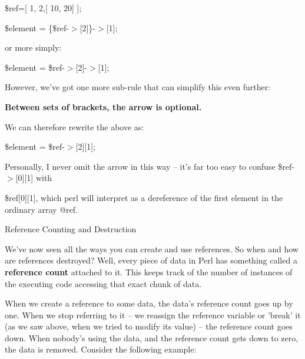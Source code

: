 \documentclass[a4paper,11pt]{book}
\begin{document}
\noindent 

\noindent 

\noindent \$ref=[ 1, 2,[ 10, 20] ];

\noindent \$element = \{\$ref-$>$[2]\}-$>$[1];

\noindent 

\noindent or more simply:

\noindent 

\noindent 

\noindent \$element = \$ref-$>$[2]-$>$[1];

\noindent 

\noindent However, we've got one more sub-rule that can simplify this even further:

\noindent 

\noindent 

\noindent \textbf{Between sets of brackets, the arrow is optional.}

\noindent 

\noindent 

\noindent We can therefore rewrite the above as:

\noindent 

\noindent \$element = \$ref-$>$[2][1];

\noindent 

\noindent 

\noindent Personally, I never omit the arrow in this way -- it's far too easy to confuse \$ref-$>$[0][1] with

\noindent \$ref[0][1], which perl will interpret as   a dereference of the first element in the ordinary array @ref.

\noindent 

\noindent Reference Counting and Destruction

\noindent 

\noindent We've now seen all the ways you can create and use references. So when and how are references destroyed? Well, every piece of data in Perl has something called a \textbf{reference count }attached to it. This keeps track of the number of instances of the executing code accessing that exact chunk of data.

\noindent 

\noindent When we create a reference to some data, the data's reference count goes up by one. When we stop referring to it -- we reassign the reference variable or 'break' it (as we saw above, when we tried to modify its value) -- the reference count goes down. When nobody's using the data, and the reference count gets down to zero, the data is removed. Consider the following example:
\end{document}
